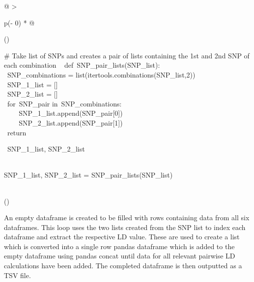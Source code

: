 \documentclass[12pt,a4paper]{article}
\begin{document}
\begin{longtable}[]{@{}
  >{\raggedright\arraybackslash}p{(\columnwidth - 0\tabcolsep) * }@{}}
\toprule()
\endhead
\begin{minipage}[t]{\linewidth}\raggedright
{\# Take list of SNPs and creates a pair of lists containing the 1st and
2nd SNP of each combination ~}{\hfill\break
}{def}{~}{SNP\_pair\_lists}{(SNP\_list):\\
\hspace*{0.333em} ~SNP\_combinations =
list(itertools.combinations(SNP\_list,}{2}{))\\
\hspace*{0.333em} ~SNP\_1\_list = {[}{]}\\
\hspace*{0.333em} ~SNP\_2\_list = {[}{]}\\
\hspace*{0.333em} ~}{for}{~SNP\_pair }{in}{~SNP\_combinations:\\
\hspace*{0.333em} ~ ~ ~SNP\_1\_list.append(SNP\_pair{[}}{0}{{]})\\
\hspace*{0.333em} ~ ~ ~SNP\_2\_list.append(SNP\_pair{[}}{1}{{]})\\
\hspace*{0.333em} ~}{return}{~SNP\_1\_list, SNP\_2\_list\\
\strut \\
SNP\_1\_list, SNP\_2\_list = SNP\_pair\_lists(SNP\_list)}\strut
\end{minipage} \\
\bottomrule()
\end{longtable}

{}

{An empty dataframe is created to be filled with rows containing data
from all six dataframes. This loop uses the two lists created from the
SNP list to index each dataframe and extract the respective LD value.
These are used to create a list which is converted into a single row
pandas dataframe which is added to the empty dataframe using pandas
concat until data for all relevant pairwise LD calculations have been
added. The completed dataframe is then outputted as a TSV file.}

\protect\hypertarget{t.a0d21dcccdcbe0c4a56237beb3046f132352f165}{}{}\protect\hypertarget{t.10}{}{}
\end{document}
